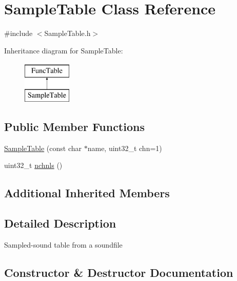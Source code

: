 \hypertarget{class_sample_table}{}\section{Sample\+Table Class Reference}
\label{class_sample_table}


{\ttfamily \#include $<$Sample\+Table.\+h$>$}

Inheritance diagram for Sample\+Table\+:\begin{figure}[H]
\begin{center}
\leavevmode
\includegraphics[height=2.000000cm]{class_sample_table}
\end{center}
\end{figure}
\subsection*{Public Member Functions}
\begin{DoxyCompactItemize}
\item 
\hyperlink{class_sample_table_aefe6f992664d4072ef6d521fcd87f2b8}{Sample\+Table} (const char $\ast$name, uint32\+\_\+t chn=1)
\item 
uint32\+\_\+t \hyperlink{class_sample_table_abab11cfefc24be1ad15a5fdbf9cd29dc}{nchnls} ()
\end{DoxyCompactItemize}
\subsection*{Additional Inherited Members}


\subsection{Detailed Description}
Sampled-\/sound table from a soundfile 

\subsection{Constructor \& Destructor Documentation}
\mbox{\label{class_sample_table_aefe6f992664d4072ef6d521fcd87f2b8}} 
